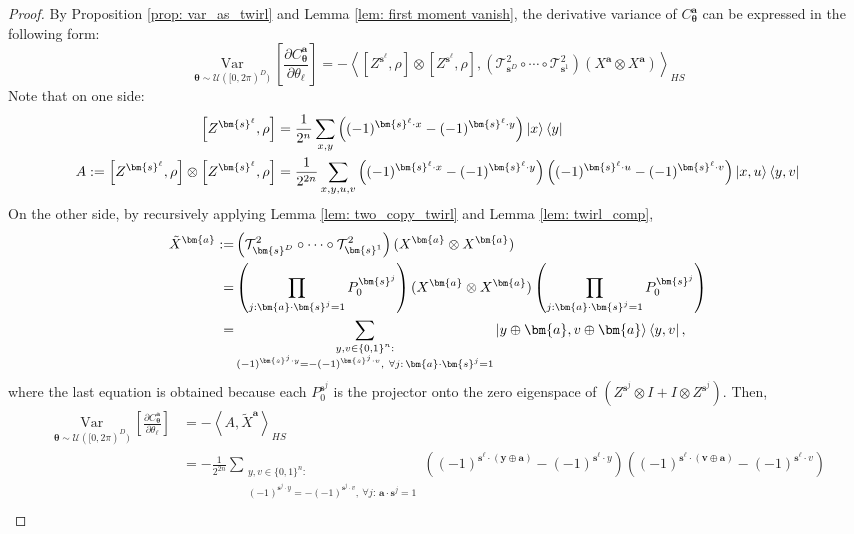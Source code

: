 \documentclass[a4paper,onecolumn,notitlepage,nofootinbib,longbibliography,superscriptaddress, floatfix, pra, aps, 10pt]{revtex4-2}
\newcommand{\inner}[2]{\left\langle #1, #2 \right\rangle}
\newcommand{\vttheta}{{\bm{\theta}}}
\newcommand{\vta}{{\bm{a}}}
\newcommand{\vty}{{\bm{y}}}
\newcommand{\vtv}{{\bm{v}}}
\newcommand{\vtsj}{{\bm{s}^j}}
\newcommand{\vtsl}{{\bm{s}^\ell}}
\newcommand{\vts}{{\bm{s}}}
\begin{document}
\begin{proof}
By Proposition \ref{prop: var_as_twirl} and Lemma \ref{lem: first moment vanish}, the derivative variance of $C^\vta_\vttheta$ can be expressed in the following form:
\begin{equation}
\operatorname*{Var}_{\vttheta \sim \mathcal{U}([0,2\pi)^D)}\left[\frac{\partial C^\vta_\vttheta}{\partial {\theta_\ell}}\right] = - \inner{\left[Z^\vtsl,\rho\right] \otimes \left[Z^\vtsl,\rho\right]}{\left(\mathcal{T}^2_{\vts^D}\circ\cdots\circ\mathcal{T}^2_{\vts^1} \right)(X^\vta \otimes X^\vta)}_{HS}
\end{equation}
Note that on one side:
\begin{align}
\left[Z^\vtsl,\rho\right] &= \frac{1}{2^n} \sum_{x,y} \left((-1)^{\vtsl \cdot x} - (-1)^{\vtsl \cdot y} \right) \ket{x}\bra{y} \\
A :=\left[Z^\vtsl,\rho\right] \otimes \left[Z^\vtsl,\rho\right]&= \frac{1}{2^{2n}} \sum_{x,y,u,v} \left((-1)^{\vtsl \cdot x} - (-1)^{\vtsl \cdot y} \right) \left((-1)^{\vtsl \cdot u} - (-1)^{\vtsl \cdot v} \right) \ket{x,u}\bra{y,v}
\end{align}
On the other side, by recursively applying Lemma \ref{lem: two_copy_twirl} and Lemma \ref{lem: twirl_comp}, 
\begin{align}
\tilde{X}^\vta :=& \left(\mathcal{T}^2_{\vts^D}\circ\cdots\circ\mathcal{T}^2_{\vts^1}\right)(X^\vta \otimes X^\vta) \\ =& \left(\prod_{j:\vta \cdot \vtsj = 1} P_0^\vtsj\right) (X^\vta \otimes X^\vta)  \left(\prod_{j:\vta \cdot \vtsj = 1} P_0^\vtsj\right) \label{eq: joint twirling equation} \\
=& \sum_{\substack{y,v \in \{0,1\}^n:\\ (-1)^{\vts^j \cdot y} = -(-1)^{\vts^j \cdot v},\ \forall j:\,\vta\cdot\vts^j=1}}
\ket{y\oplus \vta, v\oplus \vta}\bra{y,v}, \label{eq: number of surviving}
\end{align}
where the last equation is obtained because each $P_0^{\vts^j}$ is the projector onto the zero eigenspace of $(Z^{\vtsj} \otimes I + I\otimes Z^{\vtsj})$. Then, 
\begin{align}
    \operatorname*{Var}_{\vttheta \sim \mathcal{U}([0,2\pi)^D)}\left[\frac{\partial C^\vta_\vttheta}{\partial {\theta_\ell}}\right] &= - \inner{A}{\tilde{X}^\vta}_{HS} \\
    &= - \frac{1}{2^{2n}} \sum_{\substack{y,v \in \{0,1\}^n:\\ (-1)^{\vts^j \cdot y} = -(-1)^{\vts^j \cdot v},\ \forall j:\,\vta\cdot\vts^j=1}}  \left((-1)^{\vtsl \cdot (\vty \oplus \vta)} - (-1)^{\vtsl \cdot y} \right) \left((-1)^{\vtsl \cdot (\vtv \oplus \vta)} - (-1)^{\vtsl \cdot v} \right)  \\

\end{align}
\end{proof}
\end{document}
